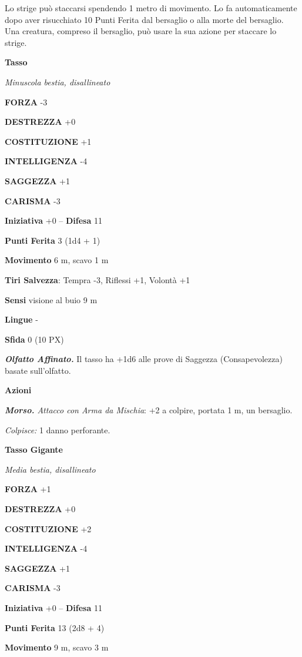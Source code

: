 \begin{multicols}{2}
	Lo strige può staccarsi spendendo 1 metro di movimento. Lo fa automaticamente dopo aver risucchiato 10 Punti Ferita dal bersaglio o alla morte del bersaglio. Una creatura, compreso il bersaglio, può usare la sua azione per staccare lo strige.

	\medskip\textbf{Tasso}

	\textit{Minuscola bestia, disallineato}

	\textbf{FORZA} -3

	\textbf{DESTREZZA} +0

	\textbf{COSTITUZIONE} +1

	\textbf{INTELLIGENZA} -4

	\textbf{SAGGEZZA} +1

	\textbf{CARISMA} -3

	\textbf{Iniziativa} +0 -- \textbf{Difesa} 11

	\textbf{Punti Ferita} 3 (1d4 + 1)

	\textbf{Movimento} 6 m, scavo 1 m

	\textbf{Tiri Salvezza}: Tempra -3, Riflessi +1, Volontà +1

	\textbf{Sensi} visione al buio 9 m

	\textbf{Lingue} -

	\textbf{Sfida} 0 (10 PX)

	\textit{\textbf{Olfatto Affinato.}} Il tasso ha +1d6 alle prove di Saggezza (Consapevolezza) basate sull'olfatto.

	\textbf{Azioni}

	\textit{\textbf{Morso.} Attacco con Arma da Mischia}: +2 a colpire, portata 1 m, un bersaglio.

	\textit{Colpisce:} 1 danno perforante.

	\medskip\textbf{Tasso Gigante}

	\textit{Media bestia, disallineato}

	\textbf{FORZA} +1

	\textbf{DESTREZZA} +0

	\textbf{COSTITUZIONE} +2

	\textbf{INTELLIGENZA} -4

	\textbf{SAGGEZZA} +1

	\textbf{CARISMA} -3

	\textbf{Iniziativa} +0 -- \textbf{Difesa} 11

	\textbf{Punti Ferita} 13 (2d8 + 4)

	\textbf{Movimento} 9 m, scavo 3 m


\end{multicols}
